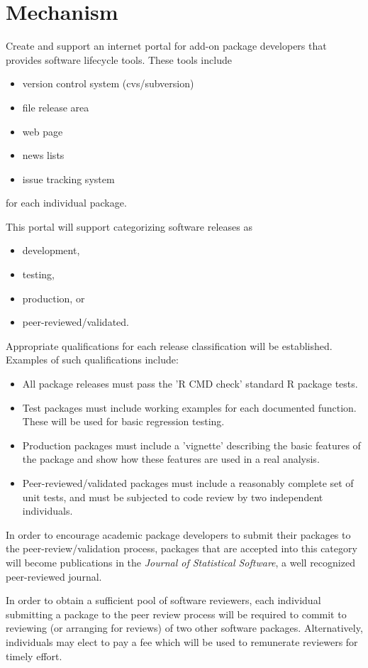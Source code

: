 \documentclass[12pt]{article}
\begin{document}
\section{Mechanism}

Create and support an internet portal for add-on package developers
that provides software lifecycle tools.	 These tools include
\begin{itemize}
\item version control system (cvs/subversion)
\item file release area
\item web page
\item news lists
\item issue tracking system
\end{itemize} for each individual package.

This portal will support categorizing software releases as
\begin{itemize}
\item development,
\item testing,
\item production, or
\item peer-reviewed/validated.
\end{itemize}

Appropriate qualifications for each release classification will be
established.	Examples of such qualifications include:
\begin{itemize}
\item All package releases must pass the 'R CMD check'
	standard R package tests.
\item Test packages must include working examples for each documented
	function.	 These will be used for basic regression testing.
\item Production packages must include a 'vignette' describing the
	basic features of the package and show how these features are used
	in a real analysis.
\item Peer-reviewed/validated packages must include a reasonably
	complete set of unit tests, and must be subjected to code review by
	two independent individuals.
\end{itemize}

In order to encourage academic package developers to submit their
packages to the peer-review/validation process, packages that are
accepted into this category will become publications in the
\emph{Journal of Statistical Software}, a well recognized
peer-reviewed journal.

In order to obtain a sufficient pool of software reviewers, each
individual submitting a package to the peer review process will be
required to commit to reviewing (or arranging for reviews) of two
other software packages.	Alternatively, individuals may elect to
pay a fee which will be used to remunerate reviewers for timely
effort.
\end{document}
